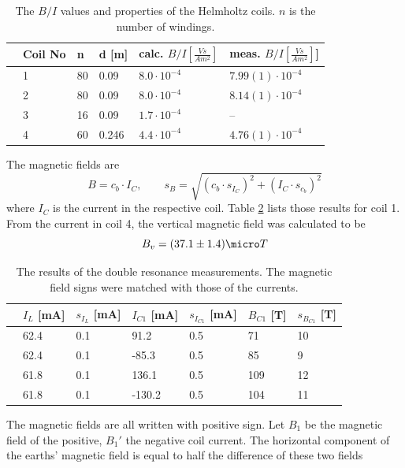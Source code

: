 \begin{table}\centering
	\begin{tabular}{@{}llllll@{}}
		\toprule
		&Coil No&n &d [m]&calc. $\unit{B/I}{[\frac{Vs}{Am^2}]}$&meas. $\unit{B/I}{[\frac{Vs}{Am^2}]}$]\\ 
		\midrule
		&1&80&0.09&$8.0\cdot10^{-4}$&$7.99(1)\cdot10^{-4}$\\
		&2&80&0.09&$8.0\cdot10^{-4}$&$8.14(1)\cdot10^{-4}$\\
		&3&16&0.09&$1.7\cdot10^{-4}$&--\\
		&4&60&0.246&$4.4\cdot10^{-4}$&$4.76(1)\cdot10^{-4}$\\
		\bottomrule
	\end{tabular}
	\caption[Properties of the magnetic field coils]{The $B/I$ values and properties of the Helmholtz coils. $n$ is the number of windings. \cite{anleitung}}
	\label{tb:coilconstants}
\end{table}
The magnetic fields are
\begin{equation}
B=c_b\cdot I_C,\qquad s_B=\sqrt{(c_b\cdot s_{I_C})^2+(I_C\cdot s_{c_b})^2}
\end{equation}
where $I_C$ is the current in the respective coil. Table \ref{tb:doubleresonance} lists those results for coil 1. From the current in coil 4, the vertical magnetic field was calculated to be
\begin{equation}
B_v=\unit{(37.1\pm1.4)}{\micro T}
\end{equation}
\begin{table}\centering
	\begin{tabular}{@{}lllllll@{}}
		\toprule
		&$I_L$ [mA]&$s_{I_L}$ [mA]&$I_{C1}$	[mA]&$s_{I_{C1}}$ [mA]&$B_{C1}$ [\micro T]&$s_{B_{C1}}$ [\micro T]\\ 
		\midrule
		&62.4&0.1&91.2&0.5&71&10\\
		&62.4&0.1&-85.3&0.5&85&9\\
		&61.8&0.1&136.1&0.5&109&12\\
		&61.8&0.1&-130.2&0.5&104&11\\
		\bottomrule
	\end{tabular}
	\caption[Results of the double resonance measurements]{The results of the double resonance measurements. The magnetic field signs were matched with those of the currents.}
	\label{tb:doubleresonance}
\end{table}
The magnetic fields are all written with positive sign. Let $B_1$ be the magnetic field of the positive, $B_1'$ the negative coil current. The horizontal component of the earths' magnetic field is equal to half the difference of these two fields
